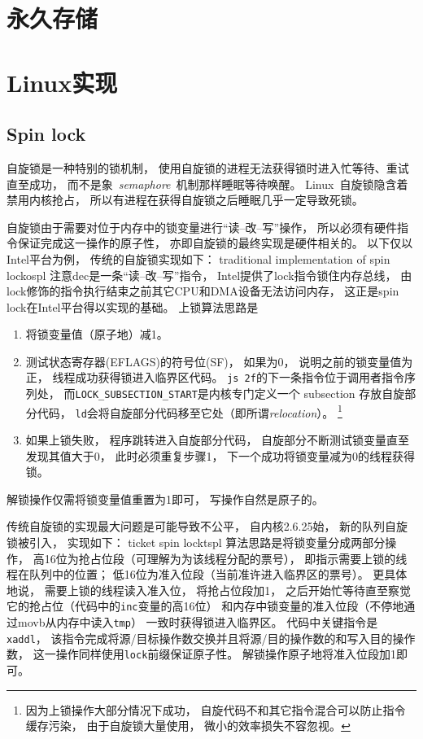 \documentclass[11pt]{article}
\begin{document}
\section{永久存储}


\section{Linux实现}
\subsection{Spin lock}
自旋锁是一种特别的锁机制，
使用自旋锁的进程无法获得锁时进入忙等待、重试直至成功，
而不是象~{\em semaphore}~机制那样睡眠等待唤醒。
Linux~自旋锁隐含着禁用内核抢占，
所以有进程在获得自旋锁之后睡眠几乎一定导致死锁。

自旋锁由于需要对位于内存中的锁变量进行``读--改--写''操作，
所以必须有硬件指令保证完成这一操作的原子性，
亦即自旋锁的最终实现是硬件相关的。
以下仅以Intel平台为例，
传统的自旋锁实现如下：
              {traditional implementation of spin lock}{ospl}
注意dec是一条``读--改--写''指令，
Intel提供了lock指令锁住内存总线，
由lock修饰的指令执行结束之前其它CPU和DMA设备无法访问内存，
这正是spin lock在Intel平台得以实现的基础。
上锁算法思路是
\begin{enumerate}
  \item 将锁变量值（原子地）减1。
  \item 测试状态寄存器(EFLAGS)的符号位(SF)，
        如果为0，
        说明之前的锁变量值为正，
        线程成功获得锁进入临界区代码。
        \verb|js 2f|的下一条指令位于调用者指令序列处，
        而\verb|LOCK_SUBSECTION_START|是内核专门定义一个 subsection 存放自旋部分代码，
        \verb|ld|会将自旋部分代码移至它处（即所谓{\em relocation}）。
        \footnote{
        因为上锁操作大部分情况下成功，
        自旋代码不和其它指令混合可以防止指令缓存污染，
        由于自旋锁大量使用，
        微小的效率损失不容忽视。}
  \item 如果上锁失败，
        程序跳转进入自旋部分代码，
        自旋部分不断测试锁变量直至发现其值大于0，
        此时必须重复步骤1，
        下一个成功将锁变量减为0的线程获得锁。
\end{enumerate}

解锁操作仅需将锁变量值重置为1即可，
写操作自然是原子的。

传统自旋锁的实现最大问题是可能导致不公平，
自内核2.6.25始，
新的队列自旋锁被引入，
实现如下：
              {ticket spin lock}{tspl}
算法思路是将锁变量分成两部分操作，
高16位为抢占位段（可理解为为该线程分配的票号），
即指示需要上锁的线程在队列中的位置；
低16位为准入位段（当前准许进入临界区的票号）。
更具体地说，
需要上锁的线程读入准入位，
将抢占位段加1，
之后开始忙等待直至察觉它的抢占位（代码中的\verb|inc|变量的高16位）%
和内存中锁变量的准入位段（不停地通过movb从内存中读入\verb|tmp|）%
一致时获得锁进入临界区。
代码中关键指令是\verb|xaddl|，
该指令完成将源/目标操作数交换并且将源/目的操作数的和写入目的操作数，
这一操作同样使用\verb|lock|前缀保证原子性。
解锁操作原子地将准入位段加1即可。
\end{document}
